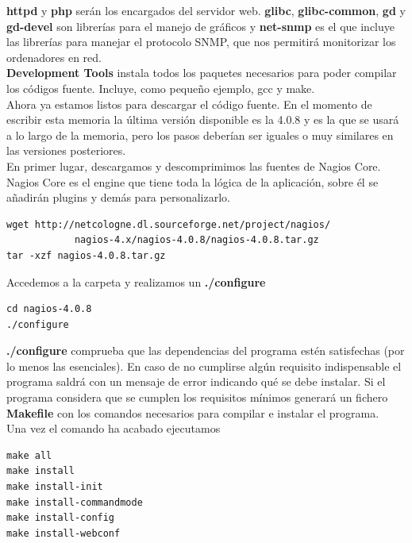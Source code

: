 \documentclass[11pt,a4paper]{article}
\begin{document}
\textbf{httpd} y \textbf{php} serán los encargados del servidor web. \textbf{glibc}, \textbf{glibc-common}, \textbf{gd} y \textbf{gd-devel} son librerías para el manejo de gráficos y \textbf{net-snmp} es el que incluye las librerías para manejar el protocolo SNMP, que nos permitirá monitorizar los ordenadores en red.
\\

\textbf{Development Tools} instala todos los paquetes necesarios para poder compilar los códigos fuente. Incluye, como pequeño ejemplo, gcc y make.
\\

Ahora ya estamos listos para descargar el código fuente. En el momento de escribir esta memoria la última versión disponible es la 4.0.8 y es la que se usará a lo largo de la memoria, pero los pasos deberían ser iguales o muy similares en las versiones posteriores.
\\

En primer lugar, descargamos y descomprimimos las fuentes de Nagios Core. Nagios Core es el engine que tiene toda la lógica de la aplicación, sobre él se añadirán plugins y demás para personalizarlo.

\begin{verbatim}
wget http://netcologne.dl.sourceforge.net/project/nagios/
            nagios-4.x/nagios-4.0.8/nagios-4.0.8.tar.gz
tar -xzf nagios-4.0.8.tar.gz
\end{verbatim}

Accedemos a la carpeta y realizamos un \textbf{./configure}

\begin{verbatim}
cd nagios-4.0.8
./configure
\end{verbatim}

\textbf{./configure} comprueba que las dependencias del programa estén satisfechas (por lo menos las esenciales). En caso de no cumplirse algún requisito indispensable el programa saldrá con un mensaje de error indicando qué se debe instalar. Si el programa considera que se cumplen los requisitos mínimos generará un fichero \textbf{Makefile} con los comandos necesarios para compilar e instalar el programa.
\\

Una vez el comando ha acabado ejecutamos

\begin{verbatim}
make all
make install
make install-init
make install-commandmode
make install-config
make install-webconf
\end{verbatim}
\end{document}
